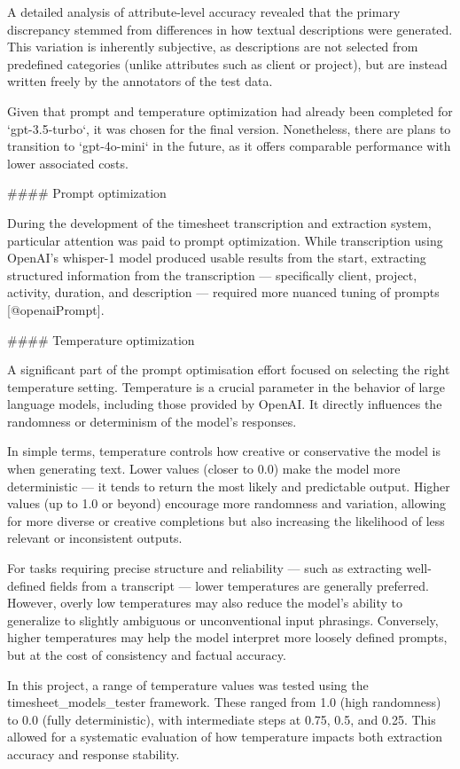 \documentclass[
  digital,     %
  oneside,     %
  nosansbold,  %
  nocolorbold, %
  lof,         %
  lot,         %
]{fithesis4}
\begin{document}
\begin{markdown}
A detailed analysis of attribute-level accuracy revealed that the primary discrepancy stemmed from differences in how textual descriptions were generated. This variation is inherently subjective, as descriptions are not selected from predefined categories (unlike attributes such as client or project), but are instead written freely by the annotators of the test data.

Given that prompt and temperature optimization had already been completed for `gpt-3.5-turbo`, it was chosen for the final version. Nonetheless, there are plans to transition to `gpt-4o-mini` in the future, as it offers comparable performance with lower associated costs.

#### Prompt optimization

During the development of the timesheet transcription and extraction system, particular attention was paid to prompt optimization. While transcription using OpenAI's whisper-1 model produced usable results from the start, extracting structured information from the transcription — specifically client, project, activity, duration, and description — required more nuanced tuning of prompts [@openaiPrompt].

#### Temperature optimization

A significant part of the prompt optimisation effort focused on selecting the right temperature setting. Temperature is a crucial parameter in the behavior of large language models, including those provided by OpenAI. It directly influences the randomness or determinism of the model's responses.

In simple terms, temperature controls how creative or conservative the model is when generating text. Lower values (closer to 0.0) make the model more deterministic — it tends to return the most likely and predictable output. Higher values (up to 1.0 or beyond) encourage more randomness and variation, allowing for more diverse or creative completions but also increasing the likelihood of less relevant or inconsistent outputs.

For tasks requiring precise structure and reliability — such as extracting well-defined fields from a transcript — lower temperatures are generally preferred. However, overly low temperatures may also reduce the model's ability to generalize to slightly ambiguous or unconventional input phrasings. Conversely, higher temperatures may help the model interpret more loosely defined prompts, but at the cost of consistency and factual accuracy.

In this project, a range of temperature values was tested using the timesheet_models_tester framework. These ranged from 1.0 (high randomness) to 0.0 (fully deterministic), with intermediate steps at 0.75, 0.5, and 0.25. This allowed for a systematic evaluation of how temperature impacts both extraction accuracy and response stability.

\end{markdown}
\shorthandon{-}
\end{document}

